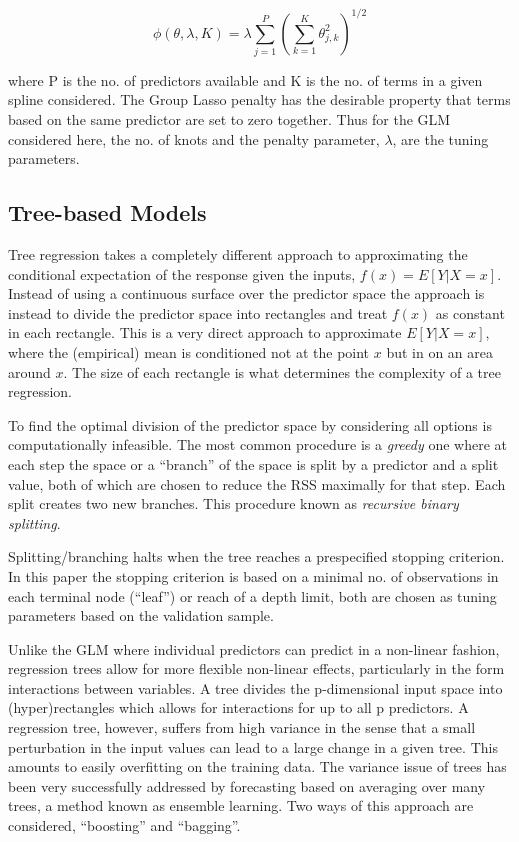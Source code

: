 \documentclass[11pt]{article}
\begin{document}
\[\phi(\theta, \lambda, K) = \lambda \sum_{j=1}^P \left(  \sum_{k=1}^K \theta_{j,k}^2   \right)^{1/2}\]

where P is the no. of predictors available and K is the no. of terms in
a given spline considered. The Group Lasso penalty has the desirable
property that terms based on the same predictor are set to zero
together. Thus for the GLM considered here, the no. of knots and the
penalty parameter, \(\lambda\), are the tuning parameters.

\hypertarget{tree-based-models}{%
\subsection{Tree-based Models}\label{tree-based-models}}

Tree regression takes a completely different approach to approximating the
conditional expectation of the response given the inputs,
\(f(x) = E[Y|X=x]\). Instead of using a continuous surface over the
predictor space the approach is instead to divide the predictor space
into rectangles and treat \(f(x)\) as constant in each rectangle. This
is a very direct approach to approximate \(E[Y|X=x]\), where the
(empirical) mean is conditioned not at the point \(x\) but in on an area
around \(x\). The size of each rectangle is what determines the
complexity of a tree regression.

To find the optimal division of the predictor space by considering all
options is computationally infeasible. The most common procedure is a
\emph{greedy} one where at each step the space or a ``branch'' of the
space is split by a predictor and a split value, both of which are
chosen to reduce the RSS maximally for that step. Each split creates two
new branches. This procedure known as \emph{recursive binary splitting}.

Splitting/branching halts when the tree reaches a prespecified stopping
criterion. In this paper the stopping criterion is based on a minimal
no. of observations in each terminal node (``leaf'') or reach of a depth
limit, both are chosen as tuning parameters based on the validation
sample.

Unlike the GLM where individual predictors can predict in a non-linear
fashion, regression trees allow for more flexible non-linear effects,
particularly in the form interactions between variables. A tree divides
the p-dimensional input space into (hyper)rectangles which allows for
interactions for up to all p predictors. A regression tree, however,
suffers from high variance in the sense that a small perturbation in the
input values can lead to a large change in a given tree. This amounts to
easily overfitting on the training data. The variance issue of trees has
been very successfully addressed by forecasting based on averaging over
many trees, a method known as ensemble learning. Two ways of this approach are considered, ``boosting'' and ``bagging''.
\end{document}
